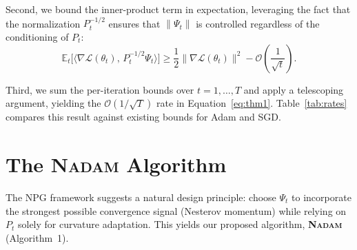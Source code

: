 \documentclass[11pt,twoside,openright]{book}
\begin{document}
Second, we bound the inner-product term in expectation, leveraging the fact that the
normalization $P_t^{-1/2}$ ensures that $\|\Psi_t\|$ is controlled regardless of the
conditioning of $P_t$:
\begin{equation}
  \mathbb{E}_t\bigl[\langle\nabla\mathcal{L}(\theta_t),\, P_t^{-1/2}\Psi_t\rangle\bigr]
    \geq \frac{1}{2}\|\nabla\mathcal{L}(\theta_t)\|^2 - \mathcal{O}\!\left(\frac{1}{\sqrt{t}}\right).
  \label{eq:inner}
\end{equation}

Third, we sum the per-iteration bounds over $t = 1,\dots,T$ and apply a telescoping argument,
yielding the $\mathcal{O}(1/\sqrt{T})$ rate in Equation~\ref{eq:thm1}. Table~\ref{tab:rates}
compares this result against existing bounds for Adam and SGD.

\section{The \textsc{Nadam} Algorithm}

The NPG framework suggests a natural design principle: choose $\Psi_t$ to incorporate the
strongest possible convergence signal (Nesterov momentum) while relying on $P_t$ solely for
curvature adaptation. This yields our proposed algorithm, \textbf{\textsc{Nadam}} (Algorithm~1).
\end{document}
